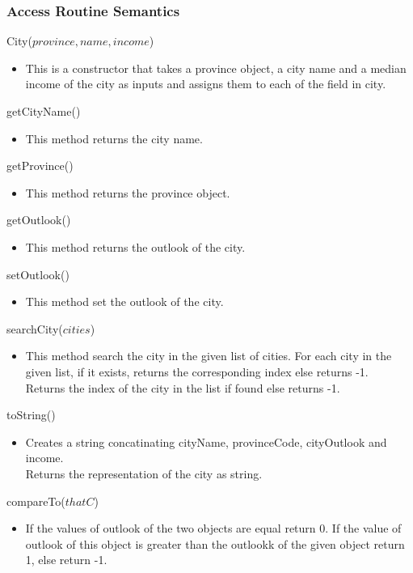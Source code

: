 \documentclass[12pt,fleqn]{article}
\begin{document}
\subsubsection*{Access Routine Semantics}
\noindent City($province, name, income$)
\begin{itemize}
\item This is a constructor that takes a province object, a city name and a median income of the city as inputs
and assigns them to each of the field in city.
\end{itemize}
\noindent getCityName()
\begin{itemize}
\item This method returns the city name.
\end{itemize}
\noindent getProvince()
\begin{itemize}
\item This method returns the province object.
\end{itemize}
\noindent getOutlook()
\begin{itemize}
\item This method returns the outlook of the city.
\end{itemize}
\noindent setOutlook()
\begin{itemize}
\item This method set the outlook of the city.
\end{itemize}
\noindent searchCity($cities$)
\begin{itemize}
\item This method search the city in the given list of cities. For each city in the given list, if it exists, returns the corresponding index else returns -1.
\\Returns the index of the city in the list if found else returns -1.
\end{itemize}
\noindent toString()
\begin{itemize}
\item Creates a string concatinating cityName, provinceCode, cityOutlook and income. 
\\Returns the representation of the city as string.
\end{itemize}
\noindent compareTo($thatC$)
\begin{itemize}
\item If the values of outlook of the two objects are equal return 0. If the value of outlook of this object is
greater than the outlookk of the given object return 1, else return -1.
\end{itemize}
\end{document}
